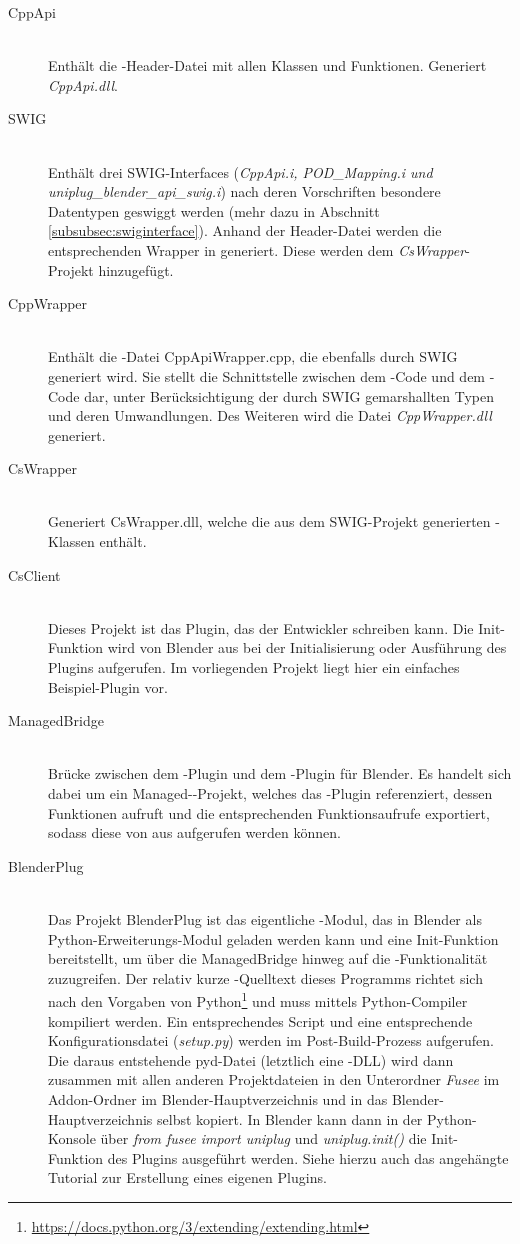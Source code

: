 \begin{description}
\item[CppApi]\hfill \\
Enthält die \CC-Header-Datei mit allen Klassen und Funktionen. Generiert \emph{CppApi.dll}.
\item[SWIG]\hfill \\
Enthält drei SWIG-Interfaces (\emph{CppApi.i, POD\_Mapping.i und \\
uniplug\_blender\_api\_swig.i}) nach deren Vorschriften besondere Datentypen geswiggt werden (mehr dazu in Abschnitt \ref{subsubsec:swiginterface}). Anhand der Header-Datei werden die entsprechenden Wrapper in \CS generiert. Diese werden dem \emph{CsWrapper}-Projekt hinzugefügt.
\item[CppWrapper]\hfill \\
Enthält die \CC-Datei CppApiWrapper.cpp, die ebenfalls durch SWIG generiert wird. Sie stellt die Schnittstelle zwischen dem \CC-Code und dem \CS-Code dar, unter Berücksichtigung der durch SWIG gemarshallten Typen und deren Umwandlungen. Des Weiteren wird die Datei \emph{CppWrapper.dll} generiert.
\item[CsWrapper]\hfill \\
Generiert CsWrapper.dll, welche die aus dem SWIG-Projekt generierten \CS-Klassen enthält. 
\item[CsClient]\hfill \\
Dieses Projekt ist das Plugin, das der Entwickler schreiben kann. Die Init-Funktion wird von Blender aus bei der Initialisierung oder Ausführung des Plugins aufgerufen. Im vorliegenden Projekt liegt hier ein einfaches Beispiel-Plugin vor.
\item[ManagedBridge]\hfill \\ 
Brücke zwischen dem \CS-Plugin und dem \CC-Plugin für Blender. Es handelt sich dabei um ein Managed-\CC-Projekt, welches das \CS-Plugin referenziert, dessen Funktionen aufruft und die entsprechenden Funktionsaufrufe exportiert, sodass diese von \CC aus aufgerufen werden können.
\item[BlenderPlug]\hfill \\ 
Das Projekt BlenderPlug ist das eigentliche \CC-Modul, das in Blender als Python-Erweiterungs-Modul geladen werden kann und eine Init-Funktion bereitstellt, um über die ManagedBridge hinweg auf die \CS{}-Funktionalität zuzugreifen. Der relativ kurze \CC-Quelltext dieses Programms richtet sich nach den Vorgaben von Python\footnote{\url{https://docs.python.org/3/extending/extending.html}} und muss mittels Python-Compiler kompiliert werden. Ein entsprechendes Script und eine entsprechende Konfigurationsdatei (\emph{setup.py}) werden im Post-Build-Prozess aufgerufen. Die daraus entstehende pyd-Datei (letztlich eine \CC-DLL) wird dann zusammen mit allen anderen Projektdateien in den Unterordner \emph{Fusee} im Addon-Ordner im Blender-Hauptverzeichnis und in das Blender-Hauptverzeichnis selbst kopiert. In Blender kann dann in der Python-Konsole über \emph{from fusee import uniplug} und \emph{uniplug.init()} die Init-Funktion des Plugins ausgeführt werden. Siehe hierzu auch das angehängte Tutorial zur Erstellung eines eigenen Plugins.
\end{description}

